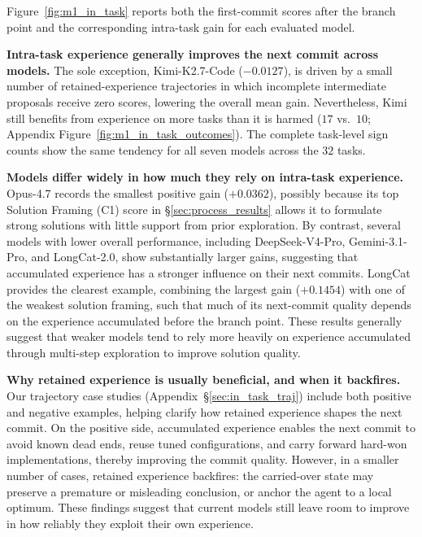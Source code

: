 

Figure~\ref{fig:m1_in_task} reports both the first-commit scores after the branch point and the corresponding intra-task gain for each evaluated model.

\textbf{Intra-task experience generally improves the next commit across models.}
The sole exception, Kimi-K2.7-Code ($-0.0127$), is driven by a small number of retained-experience trajectories in which incomplete intermediate proposals receive zero scores, lowering the overall mean gain. 
Nevertheless, Kimi still benefits from experience on more tasks than it is harmed ($17$ vs.\ $10$; Appendix Figure~\ref{fig:m1_in_task_outcomes}).
The complete task-level sign counts show the same tendency for all seven models across the $32$ tasks.

\textbf{Models differ widely in how much they rely on intra-task experience.}
Opus-4.7 records the smallest positive gain ($+0.0362$), possibly because its top Solution Framing (C1) score in \S\ref{sec:process_results} allows it to formulate strong solutions with little support from prior exploration.
By contrast, several models with lower overall performance, including DeepSeek-V4-Pro, Gemini-3.1-Pro, and LongCat-2.0, show substantially larger gains, suggesting that accumulated experience has a stronger influence on their next commits.
LongCat provides the clearest example, combining the largest gain ($+0.1454$) with one of the weakest solution framing, such that much of its next-commit quality depends on the experience accumulated before the branch point.
These results generally suggest that weaker models tend to rely more heavily on experience accumulated through multi-step exploration to improve solution quality.


\textbf{Why retained experience is usually beneficial, and when it backfires.}
Our trajectory case studies (Appendix~\S\ref{sec:in_task_traj}) include both positive and negative examples, helping clarify how retained experience shapes the next commit.
On the positive side, accumulated experience enables the next commit to avoid known dead ends, reuse tuned configurations, and carry forward hard-won implementations, thereby improving the commit quality.
However, in a smaller number of cases, retained experience backfires: the carried-over state may preserve a premature or misleading conclusion, or anchor the agent to a local optimum.
These findings suggest that current models still leave room to improve in how reliably they exploit their own experience.


